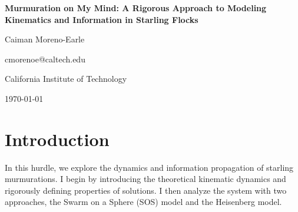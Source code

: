 \documentclass[11pt,a4paper]{article}
\numberwithin{equation}{section}
\theoremstyle{definition}
\theoremstyle{assumption}
\begin{document}
\begin{titlepage}
    \centering
    \vspace*{2cm}
    
    {\Huge\bfseries Murmuration on My Mind: A Rigorous Approach to Modeling Kinematics and Information in Starling Flocks\par}
    \vspace{1.5cm}
    
    {\Large Caiman Moreno-Earle\par}
    {cmorenoe@caltech.edu\par}
    \vspace{0.5cm}
    
    {\large California Institute of Technology\par}
    \vspace{1cm}
    \vfill
    
    {\large \today\par}
\end{titlepage}


\begin{abstract}
In this hurdle, we explore the dynamics and information propagation of starling murmurations. 
I introduce the Swarm on a Sphere (SOS) model to calculate the number of neighbors each bird tracks and 
initial alignment effects on flocking behavior ($n=6$). I then use Lyapunov Theory to prove global asymptotic stability of flocking behavior.
The Heisenberg model, and specifically Glauber dynamics, is adapted from its usual appearance in stat mech for magnetic systems to model  
the speed of information propagation and response to predator attacks. I use this to determine the speed of information propagation 
at ($\approx0.6s$ to propagate across the swarm), and determine a predator attack response threshold based on field strength and frequency of attack.
\end{abstract}

\tableofcontents
\bigskip

\section{Introduction}
In this hurdle, we explore the dynamics and information propagation of starling murmurations. I begin by introducing 
the theoretical kinematic dynamics and rigorously defining properties of solutions. I then analyze the 
system with two approaches, the Swarm on a Sphere (SOS) model and the Heisenberg model. 
\\
\end{document}
